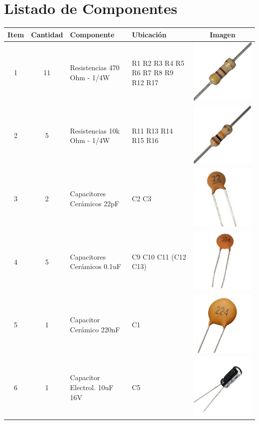 

\chapter{Listado de Componentes}

\begin{tabular}{|c|c|l|p{5cm}|c|}
	\hline
	\textbf{Item} & \textbf{Cantidad} & \textbf{Componente}          & \textbf{Ubicación}                  &                              \textbf{Imagen}                               \\[0.5cm] \hline\hline
	      1       &        11         & Resistencias 470 Ohm - 1/4W  & R1 R2 R3 R4 R5 R6 R7 R8 R9 R12 R17  &    \includegraphics[width=0.05\linewidth]{Componentes/resistencia-470}     \\[0.5cm] \hline
	      2       &         5         & Resistencias 10k Ohm - 1/4W  & R11 R13 R14 R15 R16                 &    \includegraphics[width=0.05\linewidth]{Componentes/resistencia-10k}     \\[0.5cm] \hline
	      3       &         2         & Capacitores Cerámicos 22pF   & C2 C3                               &     \includegraphics[width=0.05\linewidth]{Componentes/capacitor-22pf}     \\[0.5cm] \hline
	      4       &         5         & Capacitores Cerámicos 0.1uF  & C9 C10 C11 (C12 C13)                &     \includegraphics[width=0.05\linewidth]{Componentes/capacitor-01uf}     \\[0.5cm] \hline
	      5       &         1         & Capacitor Cerámico 220nF     & C1                                  &    \includegraphics[width=0.05\linewidth]{Componentes/capacitor-220nf}     \\[0.5cm] \hline
	      6       &         1         & Capacitor Electrol. 10uF 16V & C5                                  & \includegraphics[width=0.05\linewidth]{Componentes/capacitorelectrolitico} \\[0.5cm] \hline

\end{tabular}
